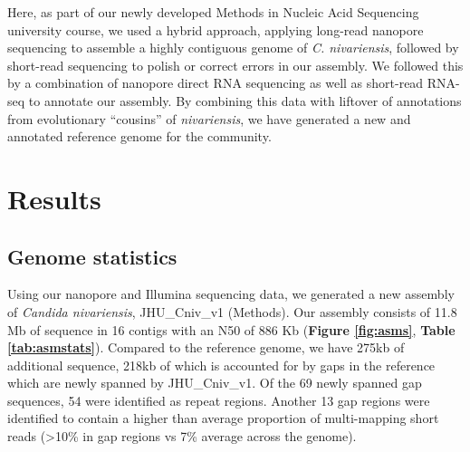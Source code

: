 Here, as part of our newly developed Methods in Nucleic Acid Sequencing university course, we used a hybrid approach, applying long-read nanopore sequencing to assemble a highly contiguous genome of \textit{C. nivariensis}, followed by short-read sequencing to polish or correct errors in our assembly. We followed this by a combination of nanopore direct RNA sequencing as well as short-read RNA-seq to annotate our assembly. By combining this data with liftover of annotations from evolutionary “cousins” of \textit{nivariensis}, we have generated a new and annotated reference genome for the community.


\section{Results}
\label{sec:results}

\subsection{Genome statistics}
\label{sec:genstat}


Using our nanopore and Illumina sequencing data, we generated a new assembly of \textit{Candida nivariensis}, JHU\_Cniv\_v1 (Methods).  Our assembly consists of 11.8 Mb of sequence in 16 contigs with an N50 of 886 Kb ({\bf Figure \ref{fig:asms}}, {\bf Table \ref{tab:asmstats}}). Compared to the reference genome, we have 275kb of additional sequence, 218kb of which is accounted for by gaps in the reference which are newly spanned by JHU\_Cniv\_v1. Of the 69 newly spanned gap sequences, 54 were identified as repeat regions. Another 13 gap regions were identified to contain a higher than average proportion of multi-mapping short reads (>10\% in gap regions vs 7\% average across the genome).



